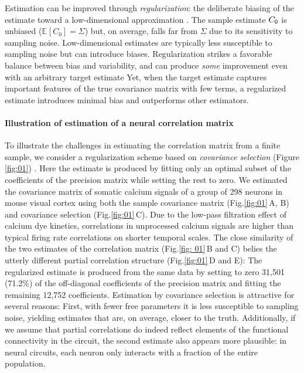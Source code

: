 \documentclass[10pt]{article}
\newcommand{\figref}[2]{Fig.\;\ref{fig:#1}\,#2}
\newcommand{\E}[2][]{\mathbb E_{#1}\left[ #2\right]}    %
\begin{document}
Estimation can be improved through \emph{regularization}: the deliberate biasing of the estimate toward a low-dimensional approximation \cite{Schafer:2005,Bickel:2006}.  The sample estimate $C_{\sf 0}$ is unbiased ($\E{C_0}=\Sigma$) but, on average, falls far from $\Sigma$ due to its sensitivity to sampling noise.  Low-dimensional estimates are typically less susceptible to sampling noise but can introduce biases.  Regularization strikes a favorable balance between bias and variability, and can produce \emph{some} improvement even with an arbitrary target estimate  Yet, when the target estimate captures important features of the true covariance matrix with few terms, a regularized estimate introduces minimal bias and outperforms other estimators. 

\paragraph{Illustration of estimation of a neural correlation matrix}
To illustrate the challenges in estimating the correlation matrix from a finite sample, we consider a regularization scheme based on \emph{covariance selection} (Figure \ref{fig:01}) \cite{Dempster:1972}. Here the estimate is produced by fitting only an optimal subset of the coefficients of the precision matrix while setting the rest to zero. We estimated the covariance matrix of somatic calcium signals of a group of 298 neurons in mouse visual cortex using both the sample covariance matrix (\figref{01}{A, B}) and covariance selection (\figref{01}{C}). Due to the low-pass filtration effect of calcium dye kinetics, correlations in unprocessed calcium signals are higher than typical firing rate correlations on shorter temporal scales. The close similarity of the two estimates of the correlation matrix (\figref{ 01}{B and C}) belies the utterly different partial correlation structure (\figref{01}{D and E}): The regularized estimate is produced from the same data by setting to zero 31,501 (71.2\%) of the off-diagonal coefficients of the precision matrix and fitting the remaining 12,752 coefficients. Estimation by covariance selection is attractive for several reasons: First, with fewer free parameters it is less susceptible to sampling noise, yielding estimates that are, on average, closer to the truth. Additionally, if we assume that partial correlations do indeed reflect elements of the functional connectivity in the circuit, the second estimate also appears more plausible: in neural circuits, each neuron only interacts with a fraction of the entire population.
\end{document}
